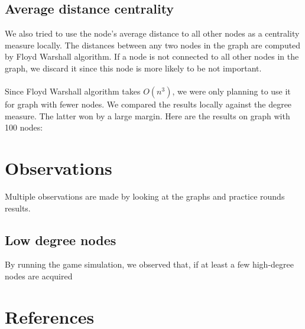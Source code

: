 \documentclass[12pt]{article}
\begin{document}
\subsection{Average distance centrality}
We also tried to use the node's average distance to all other nodes as a centrality measure locally. The distances between any two nodes in the graph are computed by Floyd Warshall algorithm. If a node is not connected to all other nodes in the graph, we discard it since this node is more likely to be not  important.\\\\
Since Floyd Warshall algorithm takes $O(n^3)$, we were only planning to use it for graph with fewer nodes. We compared the results locally against the degree measure. The latter won by a large margin. Here are the results on graph with 100 nodes:\\

\section{Observations}
Multiple observations are made by looking at the graphs and practice rounds results.
\subsection{Low degree nodes}
By running the game simulation, we observed that, if at least a few high-degree nodes are acquired

\section{References}
\end{document}
